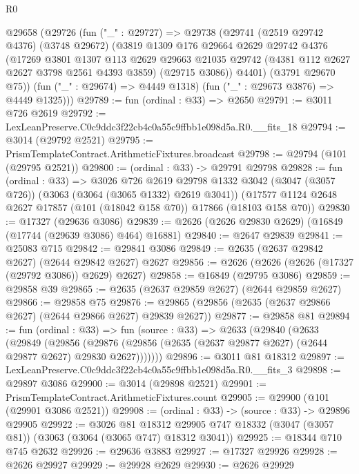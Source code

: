 \begin{lexlean}{R0}
\begin{coremodule}
  @29658
    (@29726
      (fun ("_" : @29727) =>
      @29738
        (@29741
          (@2519 @29742 @4376)
          (@3748 @29672)
          (@3819
            @1309
            @176
            @29664
            @2629
            @29742
            @4376
            (@17269
              @3801
              @1307
              @113
              @2629
              @29663
              @21035
              @29742
              (@4381 @112 @2627 @2627 @3798 @2561 @4393 @3859)
              (@29715 @3086))
            @4401)
          (@3791 @29670 @75))
        (fun ("_" : @29674) => @4449 @1318)
        (fun ("_" : @29673 @3876) => @4449 @1325)))
@29789 := fun (ordinal : @33) => @2650
@29791 := @3011 @726 @2619
@29792 := LexLeanPreserve.C0c9ddc3f22cb4c0a55c9ffbb1e098d5a.R0.__fits_18
@29794 := @3014 (@29792 @2521)
@29795 := PrismTemplateContract.ArithmeticFixtures.broadcast
@29798 := @29794 (@101 (@29795 @2521))
@29800 := (ordinal : @33) -> @29791 @29798
@29828 := fun (ordinal : @33) =>
  @3026
    @726
    @2619
    @29798
    @1332
    @3042
    (@3047 (@3057 @726))
    (@3063 (@3064 (@3065 @1332) @2619 @3041))
    (@17577 @1124 @2648 @2627 @17857 (@101 (@18042 @158 @70)) @17866 (@18103 @158 @70))
@29830 := @17327 (@29636 @3086)
@29839 := @2626 (@2626 @29830 @2629) (@16849 (@17744 (@29639 @3086) @464) @16881)
@29840 := @2647 @29839
@29841 := @25083 @715
@29842 := @29841 @3086
@29849 := @2635 (@2637 @29842 @2627) (@2644 @29842 @2627) @2627
@29856 := @2626 (@2626 (@2626 (@17327 (@29792 @3086)) @2629) @2627)
@29858 := @16849 (@29795 @3086)
@29859 := @29858 @39
@29865 := @2635 (@2637 @29859 @2627) (@2644 @29859 @2627)
@29866 := @29858 @75
@29876 := @29865 (@29856 (@2635 (@2637 @29866 @2627) (@2644 @29866 @2627) @29839 @2627))
@29877 := @29858 @81
@29894 := fun (ordinal : @33) =>
  fun (source : @33) =>
  @2633
    (@29840
      (@2633
        (@29849
          (@29856
            (@29876 (@29856 (@2635 (@2637 @29877 @2627) (@2644 @29877 @2627) @29830 @2627)))))))
@29896 := @3011 @81 @18312
@29897 := LexLeanPreserve.C0c9ddc3f22cb4c0a55c9ffbb1e098d5a.R0.__fits_3
@29898 := @29897 @3086
@29900 := @3014 (@29898 @2521)
@29901 := PrismTemplateContract.ArithmeticFixtures.count
@29905 := @29900 (@101 (@29901 @3086 @2521))
@29908 := (ordinal : @33) -> (source : @33) -> @29896 @29905
@29922 := @3026
    @81
    @18312
    @29905
    @747
    @18332
    (@3047 (@3057 @81))
    (@3063 (@3064 (@3065 @747) @18312 @3041))
@29925 := @18344 @710 @745 @2632
@29926 := @29636 @3883
@29927 := @17327 @29926
@29928 := @2626 @29927
@29929 := @29928 @2629
@29930 := @2626 @29929

\end{coremodule}
\end{lexlean}
